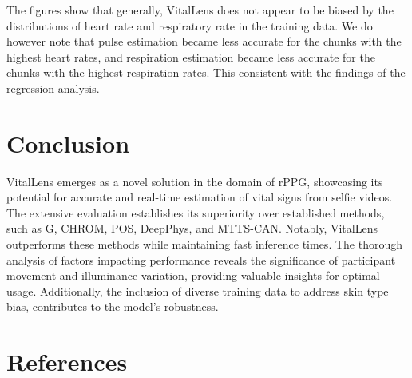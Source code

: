 \documentclass{article}
\begin{document}
The figures show that generally, VitalLens does not appear to be biased by the distributions of heart rate and respiratory rate in the training data.
We do however note that pulse estimation became less accurate for the chunks with the highest heart rates, and respiration estimation became less accurate for the chunks with the highest respiration rates.
This consistent with the findings of the regression analysis.

\section{Conclusion}
\label{sec:conclusion}

VitalLens emerges as a novel solution in the domain of rPPG, showcasing its potential for accurate and real-time estimation of vital signs from selfie videos.
The extensive evaluation establishes its superiority over established methods, such as G, CHROM, POS, DeepPhys, and MTTS-CAN.
Notably, VitalLens outperforms these methods while maintaining fast inference times.
The thorough analysis of factors impacting performance reveals the significance of participant movement and illuminance variation, providing valuable insights for optimal usage.
Additionally, the inclusion of diverse training data to address skin type bias, contributes to the model's robustness.

\section*{References}




\end{document}

